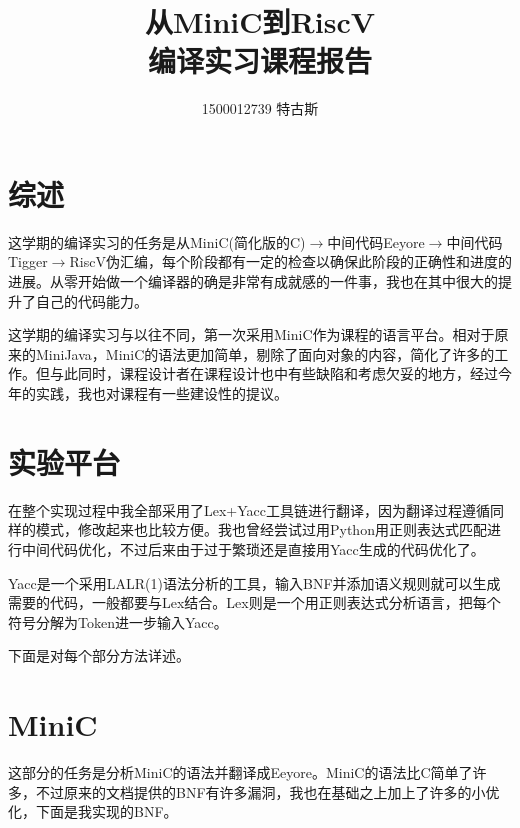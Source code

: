 \documentclass{ctexart}
\title{从MiniC到RiscV \\ \large 编译实习课程报告}
\author{1500012739 特古斯}
\begin{document}
\maketitle{}
\tableofcontents
\newpage

\section{综述}

这学期的编译实习的任务是从MiniC(简化版的C)$\rightarrow$中间代码Eeyore$\rightarrow$中间代码Tigger$\rightarrow$RiscV伪汇编，每个阶段都有一定的检查以确保此阶段的正确性和进度的进展。从零开始做一个编译器的确是非常有成就感的一件事，我也在其中很大的提升了自己的代码能力。

这学期的编译实习与以往不同，第一次采用MiniC作为课程的语言平台。相对于原来的MiniJava，MiniC的语法更加简单，剔除了面向对象的内容，简化了许多的工作。但与此同时，课程设计者在课程设计也中有些缺陷和考虑欠妥的地方，经过今年的实践，我也对课程有一些建设性的提议。

\section{实验平台}

在整个实现过程中我全部采用了Lex+Yacc工具链进行翻译，因为翻译过程遵循同样的模式，修改起来也比较方便。我也曾经尝试过用Python用正则表达式匹配进行中间代码优化，不过后来由于过于繁琐还是直接用Yacc生成的代码优化了。

Yacc是一个采用LALR(1)语法分析的工具，输入BNF并添加语义规则就可以生成需要的代码，一般都要与Lex结合。Lex则是一个用正则表达式分析语言，把每个符号分解为Token进一步输入Yacc。

下面是对每个部分方法详述。

\section{MiniC}

这部分的任务是分析MiniC的语法并翻译成Eeyore。MiniC的语法比C简单了许多，不过原来的文档提供的BNF有许多漏洞，我也在基础之上加上了许多的小优化，下面是我实现的BNF。

\newpage
\end{document}
